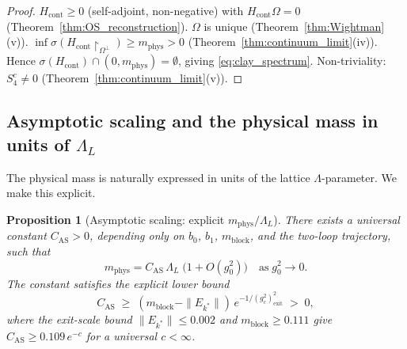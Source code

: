 \documentclass[11pt,a4paper]{amsart}
\newtheorem{proposition}[theorem]{Proposition}
\theoremstyle{definition}
\newcommand{\gB}{g^2_c}
\begin{document}
\begin{proof}
$H_{\mathrm{cont}} \ge 0$ (self-adjoint, non-negative) with
$H_{\mathrm{cont}}\Omega = 0$ (Theorem~\ref{thm:OS_reconstruction}).
$\Omega$ is unique (Theorem~\ref{thm:Wightman}(v)).
$\inf\sigma(H_{\mathrm{cont}}\restriction_{\Omega^\perp}) \ge m_{\mathrm{phys}} > 0$
(Theorem~\ref{thm:continuum_limit}(iv)).
Hence $\sigma(H_{\mathrm{cont}}) \cap (0,m_{\mathrm{phys}}) = \emptyset$,
giving \eqref{eq:clay_spectrum}.
Non-triviality: $S_4^c \ne 0$ (Theorem~\ref{thm:continuum_limit}(v)).
\end{proof}

\subsection{Asymptotic scaling and the physical mass in units of $\Lambda_L$}
\label{sec:asymptotic_scaling}

The physical mass is naturally expressed in units of the lattice $\Lambda$-parameter.
We make this explicit.

\begin{proposition}[Asymptotic scaling: explicit $m_{\mathrm{phys}}/\Lambda_L$]
\label{prop:asymptotic_scaling}
There exists a universal constant $C_{\mathrm{AS}} > 0$, depending only on
$b_0$, $b_1$, $m_{\mathrm{block}}$, and the two-loop trajectory, such that
\begin{equation}
\label{eq:mphys_lambda}
  m_{\mathrm{phys}} = C_{\mathrm{AS}}\,\Lambda_L
  \;\bigl(1 + O(g^2_0)\bigr)
  \quad\text{as}\; g^2_0\to 0.
\end{equation}
The constant satisfies the explicit lower bound
\begin{equation}
\label{eq:CAS_bound}
  C_{\mathrm{AS}}
  \;\ge\;
  (m_{\mathrm{block}} - \|E_{k^*}\|)\,
  e^{-1/(\gB)^2_{\mathrm{exit}}}
  \;>\; 0,
\end{equation}
where the exit-scale bound $\|E_{k^*}\| \le 0.002$ and $m_{\mathrm{block}} \ge 0.111$
give $C_{\mathrm{AS}} \ge 0.109\, e^{-c}$ for a universal $c < \infty$.
\end{proposition}
\end{document}
